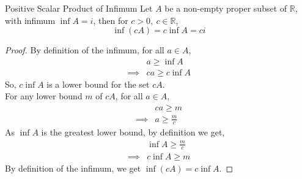 \begin{Theorem}{Positive Scalar Product of Infimum}\label{positive_scalar_product_infimum}
    Let $A$ be a non-empty proper subset of $\mathbb{R}$, with infimum $\inf A = i$, then for $c > 0,\ c\in\mathbb{R}$, $$\inf (cA) = c\inf A = ci$$
\end{Theorem}
\begin{proof}
    By definition of the infimum, for all $a\in A$,
    \begin{align*}
        & a \geq \inf A \\
        \implies & ca \geq c\inf A
    \end{align*}
    So, $c\inf A$ is a lower bound for the set $cA$.\\
    For any lower bound $m$ of $cA$, for all $a\in A$,
    \begin{align*}
        & ca \geq m\\
        \implies & a \geq \frac{m}{c}
    \end{align*}
    As $\inf A$ is the greatest lower bound, by definition we get,
    \begin{align*}
        &\inf A \geq \frac{m}{c}\\
        \implies & c\inf A \geq m
    \end{align*}
    By definition of the infimum, we get $\inf(cA) = c\inf A$.
\end{proof}

